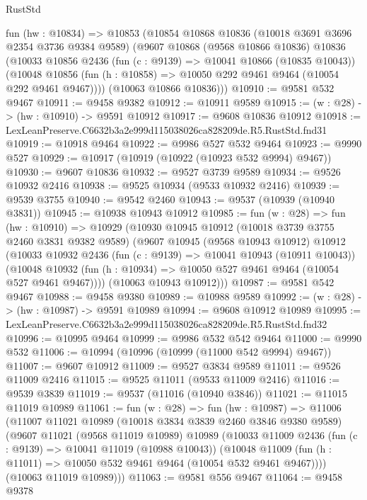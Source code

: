 \begin{lexlean}{RustStd}
\begin{coremodule}
  fun (hw : @10834) =>
  @10853
    (@10854
      @10868
      @10836
      (@10018 @3691 @3696 @2354 @3736 @9384 @9589)
      (@9607
        @10868
        (@9568 @10866 @10836)
        @10836
        (@10033
          @10856
          @2436
          (fun (c : @9139) => @10041 @10866 (@10835 @10043))
          (@10048 @10856 (fun (h : @10858) => @10050 @292 @9461 @9464 (@10054 @292 @9461 @9467))))
        (@10063 @10866 @10836)))
@10910 := @9581 @532 @9467
@10911 := @9458 @9382
@10912 := @10911 @9589
@10915 := (w : @28) -> (hw : @10910) -> @9591 @10912
@10917 := @9608 @10836 @10912
@10918 := LexLeanPreserve.C6632b3a2e999d115038026ca828209de.R5.RustStd.fnd31
@10919 := @10918 @9464
@10922 := @9986 @527 @532 @9464
@10923 := @9990 @527
@10929 := @10917 (@10919 (@10922 (@10923 @532 @9994) @9467))
@10930 := @9607 @10836
@10932 := @9527 @3739 @9589
@10934 := @9526 @10932 @2416
@10938 := @9525 @10934 (@9533 @10932 @2416)
@10939 := @9539 @3755
@10940 := @9542 @2460
@10943 := @9537 (@10939 (@10940 @3831))
@10945 := @10938 @10943 @10912
@10985 := fun (w : @28) =>
  fun (hw : @10910) =>
  @10929
    (@10930
      @10945
      @10912
      (@10018 @3739 @3755 @2460 @3831 @9382 @9589)
      (@9607
        @10945
        (@9568 @10943 @10912)
        @10912
        (@10033
          @10932
          @2436
          (fun (c : @9139) => @10041 @10943 (@10911 @10043))
          (@10048 @10932 (fun (h : @10934) => @10050 @527 @9461 @9464 (@10054 @527 @9461 @9467))))
        (@10063 @10943 @10912)))
@10987 := @9581 @542 @9467
@10988 := @9458 @9380
@10989 := @10988 @9589
@10992 := (w : @28) -> (hw : @10987) -> @9591 @10989
@10994 := @9608 @10912 @10989
@10995 := LexLeanPreserve.C6632b3a2e999d115038026ca828209de.R5.RustStd.fnd32
@10996 := @10995 @9464
@10999 := @9986 @532 @542 @9464
@11000 := @9990 @532
@11006 := @10994 (@10996 (@10999 (@11000 @542 @9994) @9467))
@11007 := @9607 @10912
@11009 := @9527 @3834 @9589
@11011 := @9526 @11009 @2416
@11015 := @9525 @11011 (@9533 @11009 @2416)
@11016 := @9539 @3839
@11019 := @9537 (@11016 (@10940 @3846))
@11021 := @11015 @11019 @10989
@11061 := fun (w : @28) =>
  fun (hw : @10987) =>
  @11006
    (@11007
      @11021
      @10989
      (@10018 @3834 @3839 @2460 @3846 @9380 @9589)
      (@9607
        @11021
        (@9568 @11019 @10989)
        @10989
        (@10033
          @11009
          @2436
          (fun (c : @9139) => @10041 @11019 (@10988 @10043))
          (@10048 @11009 (fun (h : @11011) => @10050 @532 @9461 @9464 (@10054 @532 @9461 @9467))))
        (@10063 @11019 @10989)))
@11063 := @9581 @556 @9467
@11064 := @9458 @9378

\end{coremodule}
\end{lexlean}
